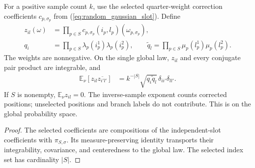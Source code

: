 \begin{theorem}
    \label{thm:construction_global_moments}
    \leanok
    For a positive sample count $k$, use the selected quarter-weight
    correction coefficients $c_{p,\sigma_p}$ from
    (\ref{eq:random_gaussian_slot}). Define
    \begin{align}
        z_{il}(\omega) & =\prod_{p\in S}
        c_{p,\sigma_p}(i_p,l_p)(\omega_{p,\sigma_p}),
        \label{eq:construction_selected_coefficient}                      \\
        q_i            & =\prod_{p\in S}\lambda_p(i_p^1)\lambda_p(i_p^2),
        \qquad
        \widetilde q_l=\prod_{p\in S}\mu_p(l_p^1)\mu_p(l_p^2).
        \label{eq:construction_selected_weights}
    \end{align}
    The weights are nonnegative. On the single global law, $z_{il}$ and
    every conjugate pair product are integrable, and
    \begin{align}
        \mathbb E_\nu[z_{il}\overline{z_{i'l'}}]
         & =k^{-|S|}\sqrt{q_i\widetilde q_l}\,
        \delta_{ii'}\delta_{ll'}.
        \label{eq:construction_selected_covariance}
    \end{align}
    If $S$ is nonempty, $\mathbb E_\nu z_{il}=0$.
    The inverse-sample exponent counts corrected positions; unselected
    positions and branch labels do not contribute.
    This is \cite[Equation~(5.11)]{OpenAI2026PolynomialPEPS}
    on the global probability space.
\end{theorem}

\begin{proof}\leanok
    The selected coefficients are compositions of the independent-slot
    coefficients with $\pi_{S,\sigma}$. Its measure-preserving identity
    transports their integrability, covariance, and centeredness to
    the global law. The selected index set has cardinality $|S|$.
\end{proof}

